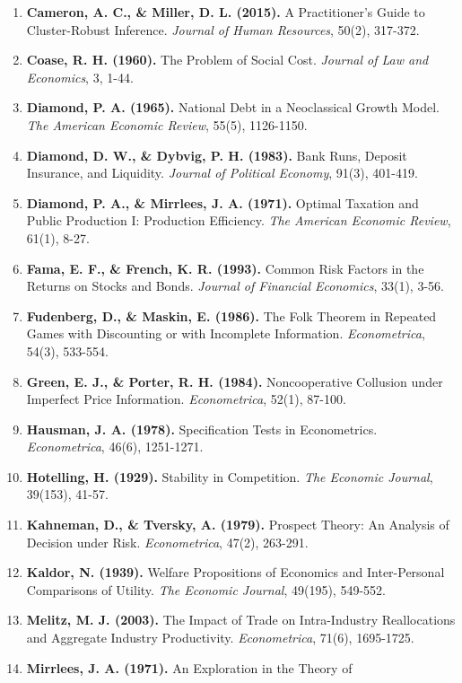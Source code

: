 \documentclass[
]{article}
\begin{document}
\begin{enumerate}
{  Econometrics}, 225(2), 200-230.
\item
  \textbf{Cameron, A. C., \& Miller, D. L. (2015).} A Practitioner's
  Guide to Cluster-Robust Inference. \emph{Journal of Human Resources},
  50(2), 317-372.
\item
  \textbf{Coase, R. H. (1960).} The Problem of Social Cost.
  \emph{Journal of Law and Economics}, 3, 1-44.
\item
  \textbf{Diamond, P. A. (1965).} National Debt in a Neoclassical Growth
  Model. \emph{The American Economic Review}, 55(5), 1126-1150.
\item
  \textbf{Diamond, D. W., \& Dybvig, P. H. (1983).} Bank Runs, Deposit
  Insurance, and Liquidity. \emph{Journal of Political Economy}, 91(3),
  401-419.
\item
  \textbf{Diamond, P. A., \& Mirrlees, J. A. (1971).} Optimal Taxation
  and Public Production I: Production Efficiency. \emph{The American
  Economic Review}, 61(1), 8-27.
\item
  \textbf{Fama, E. F., \& French, K. R. (1993).} Common Risk Factors in
  the Returns on Stocks and Bonds. \emph{Journal of Financial
  Economics}, 33(1), 3-56.
\item
  \textbf{Fudenberg, D., \& Maskin, E. (1986).} The Folk Theorem in
  Repeated Games with Discounting or with Incomplete Information.
  \emph{Econometrica}, 54(3), 533-554.
\item
  \textbf{Green, E. J., \& Porter, R. H. (1984).} Noncooperative
  Collusion under Imperfect Price Information. \emph{Econometrica},
  52(1), 87-100.
\item
  \textbf{Hausman, J. A. (1978).} Specification Tests in Econometrics.
  \emph{Econometrica}, 46(6), 1251-1271.
\item
  \textbf{Hotelling, H. (1929).} Stability in Competition. \emph{The
  Economic Journal}, 39(153), 41-57.
\item
  \textbf{Kahneman, D., \& Tversky, A. (1979).} Prospect Theory: An
  Analysis of Decision under Risk. \emph{Econometrica}, 47(2), 263-291.
\item
  \textbf{Kaldor, N. (1939).} Welfare Propositions of Economics and
  Inter-Personal Comparisons of Utility. \emph{The Economic Journal},
  49(195), 549-552.
\item
  \textbf{Melitz, M. J. (2003).} The Impact of Trade on Intra-Industry
  Reallocations and Aggregate Industry Productivity.
  \emph{Econometrica}, 71(6), 1695-1725.
\item
  \textbf{Mirrlees, J. A. (1971).} An Exploration in the Theory of

\end{enumerate}
\end{document}
